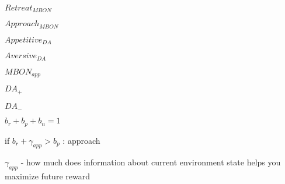 $Retreat_{MBON}$

$Approach_{MBON}$

$Appetitive_{DA}$

$Aversive_{DA}$

$MBON_{app}$

$DA_{+}$

$DA_{-}$

$b_{r} + b_{p} + b_{n} = 1$

if $b_{r} + \gamma_{app} > b_{p}$ : approach

$\gamma_{app}$ - how much does information about current environment state helps you maximize future reward
